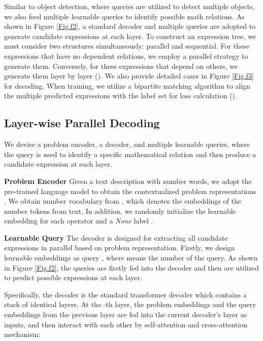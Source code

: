 \documentclass[11pt]{article}
\begin{document}
Similar to object detection, where queries are utilized to detect multiple objects, we also feed multiple learnable queries to identify possible math relations. As shown in Figure \ref{Fig.f2}, a standard decoder and multiple queries are adopted to generate candidate expressions at each layer. To construct an expression tree, we must consider two structures simultaneously: parallel and sequential. For these expressions that have no dependent relations, we employ a parallel strategy to generate them. Conversely, for these expressions that depend on others, we generate them layer by layer (). We also provide detailed cases in Figure \ref{Fig.f3} for decoding. When training, we utilize a bipartite matching algorithm to align the multiple predicted expressions with the label set for loss calculation (). 















\subsection{Layer-wise Parallel Decoding} \label{section3.2}
We devise a problem encoder, a decoder, and multiple learnable queries, where the query is used to identify a specific mathematical relation and then produce a candidate expression at each layer. 

\textbf{Problem Encoder} Given a text description  with  number words, we adopt the pre-trained language model \citep{devlin-etal-2019-bert,liu2019roberta} to obtain the contextualized problem representations . We obtain number vocabulary  from , which denotes the embeddings of the  number tokens from text. In addition, we randomly initialize the learnable embedding for each operator and a \emph{None} label .

\textbf{Learnable Query} The decoder is designed for extracting all candidate expressions in parallel based on problem representation. Firstly, we design learnable embeddings as query , where  means the number of the query. As shown in Figure \ref{Fig.f2}, the  queries are firstly fed into the decoder and then are utilized to predict  possible expressions at each layer. 

Specifically, the decoder is the standard transformer decoder which contains a stack of identical layers. At the -th layer, the problem embeddings  and the query embeddings  from the previous layer are fed into the current decoder's layer as inputs, and then interact with each other by self-attention and cross-attention mechanism:
\end{document}
